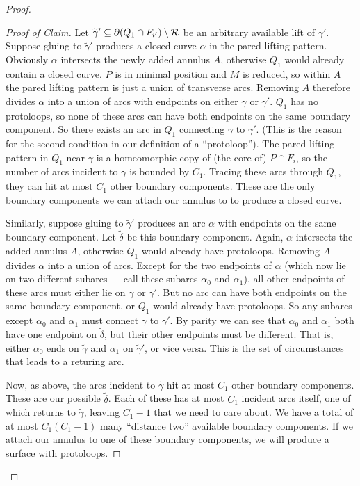 \begin{proof}
\begin{proof}[Proof of Claim]
Let $\widetilde{\gamma}' \subseteq \partial(Q_1 \cap F_{i'}) \setminus \mathcal{R}$ be an
arbitrary available lift of $\gamma'$.  Suppose gluing to $\widetilde{\gamma}'$
produces a closed curve $\alpha$ in the pared lifting pattern. Obviously
$\alpha$ intersects the newly added annulus $A$, otherwise $Q_1$ would already
contain a closed curve. $P$ is in minimal position and $M$ is reduced, so
within $A$ the pared lifting pattern is just a union of transverse arcs.
Removing $A$ therefore divides $\alpha$ into a union of arcs with endpoints on
either $\gamma$ or $\gamma'$.  $Q_1$ has no protoloops, so none of these arcs
can have both endpoints on the same boundary component. So there exists an arc
in $Q_1$ connecting $\gamma$ to $\gamma'$.  (This is the reason for the second
condition in our definition of a ``protoloop'').  The pared lifting pattern in
$Q_1$ near $\gamma$ is a homeomorphic copy of (the core of) $P \cap F_i$, so
the number of arcs incident to $\gamma$ is bounded by $C_1$.  Tracing these
arcs through $Q_1$, they can hit at most $C_1$ other boundary components.
These are the only boundary components we can attach our annulus to to produce
a closed curve.

Similarly, suppose gluing to $\widetilde{\gamma}'$ produces an arc $\alpha$
with endpoints on the same boundary component. Let $\widetilde{\delta}$ be this
boundary component. Again, $\alpha$ intersects the added annulus $A$, otherwise
$Q_1$ would already have protoloops. Removing $A$ divides $\alpha$ into a union
of arcs.  Except for the two endpoints of $\alpha$ (which now lie on two
different subarcs --- call these subarcs $\alpha_0$ and $\alpha_1$), all other
endpoints of these arcs must either lie on $\gamma$ or $\gamma'$.  But no arc
can have both endpoints on the same boundary component, or $Q_1$ would already
have protoloops.  So any subarcs except $\alpha_0$ and $\alpha_1$ must connect
$\gamma$ to $\gamma'$.  By parity we can see that $\alpha_0$ and $\alpha_1$
both have one endpoint on $\widetilde{\delta}$, but their other endpoints must
be different.  That is, either $\alpha_0$ ends on $\widetilde{\gamma}$ and
$\alpha_1$ on $\widetilde{\gamma}'$, or vice versa.  This is the set of
circumstances that leads to a returing arc.

Now, as above, the arcs incident to $\widetilde{\gamma}$ hit at most $C_1$
other boundary components. These are our possible $\widetilde{\delta}$. Each of
these has at most $C_1$ incident arcs itself, one of which returns to
$\widetilde{\gamma}$, leaving $C_1-1$ that we need to care about. We have
a total of at most $C_1(C_1-1)$ many ``distance two'' available boundary
components.  If we attach our annulus to one of these boundary components, we
will produce a surface with protoloops.


\end{proof}
\end{proof}
